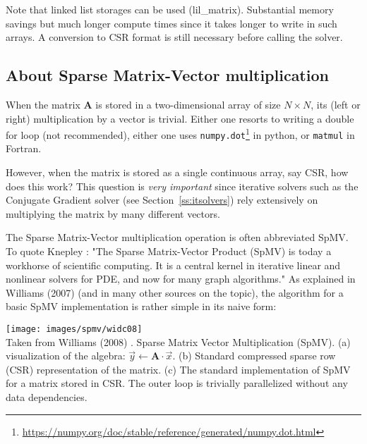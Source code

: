 Note that linked list storages can be used (lil\_matrix). Substantial memory savings 
but much longer compute times since it takes longer to write in such arrays.
A conversion to CSR format is still necessary before calling the solver.




\subsection{About Sparse Matrix-Vector multiplication} \label{ss:spmv}
 

When the matrix ${\bm A}$ is stored in a two-dimensional array of size $N\times N$, 
its (left or right) multiplication by a vector is trivial. 
Either one resorts to writing a double for loop (not recommended), 
either one uses {\tt numpy.dot}\footnote{\url{https://numpy.org/doc/stable/reference/generated/numpy.dot.html}}
in python, or {\tt matmul} in Fortran.

However, when the matrix is stored as a single continuous array, say CSR, how does this work?
This question is {\it very important} since iterative solvers such as the Conjugate Gradient solver
(see Section~\ref{ss:itsolvers}) rely extensively on multiplying the matrix by many different vectors. 

The Sparse Matrix-Vector multiplication operation is often abbreviated SpMV.
To quote Knepley \cite{knepley}: "The Sparse Matrix-Vector Product (SpMV) is today 
a workhorse of scientific computing. It is a central kernel in iterative linear and 
nonlinear solvers for PDE, and now for many graph algorithms."
As explained in Williams \etal (2007) \cite{wiov07} (and in many 
other sources on the topic), the algorithm for 
a basic SpMV implementation is rather simple in its naive form: 

\begin{center}
\texttt{[image: images/spmv/widc08]}\\
{\captionfont Taken from Williams \etal (2008) \cite{widc08}. 
Sparse Matrix Vector Multiplication (SpMV). 
(a) visualization of the algebra: $\vec{y} \leftarrow {\bm A}\cdot \vec{x}$.
(b) Standard compressed sparse row (CSR) representation of the matrix.
(c) The standard implementation of SpMV for a matrix stored in CSR. 
The outer loop is trivially parallelized without any data dependencies.}
\end{center}

